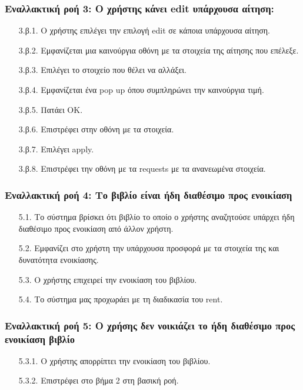 \documentclass[12pt,a4paper]{article}
\begin{document}
\subsubsection*{Εναλλακτική ροή 3: Ο χρήστης κάνει edit υπάρχουσα αίτηση:}
\begin{enumerate}
    \item [3.β.1.] Ο χρήστης επιλέγει την επιλογή edit σε κάποια υπάρχουσα αίτηση.
    \item [3.β.2.] Εμφανίζεται μια καινούργια οθόνη με τα στοιχεία της αίτησης που επέλεξε.
    \item [3.β.3.] Επιλέγει το στοιχείο που θέλει να αλλάξει.
    \item [3.β.4.] Εμφανίζεται ένα pop up όπου συμπληρώνει την καινούργια τιμή.
    \item [3.β.5.] Πατάει OK.
    \item [3.β.6.] Επιστρέφει στην οθόνη με τα στοιχεία.
    \item [3.β.7.] Επιλέγει apply.
    \item [3.β.8.] Επιστρέφει την οθόνη με τα requests με τα ανανεωμένα στοιχεία.
\end{enumerate}

\subsubsection*{Εναλλακτική ροή 4: Το βιβλίο είναι ήδη διαθέσιμο προς ενοικίαση}
\begin{enumerate}
    \item[5.1.] Το σύστημα βρίσκει ότι βιβλίο το οποίο ο χρήστης αναζητούσε υπάρχει ήδη διαθέσιμο προς ενοικίαση από άλλον χρήστη.
    \item[5.2.] Εμφανίζει στο χρήστη την υπάρχουσα προσφορά με τα στοιχεία της και δυνατότητα ενοικίασης.
    \item[5.3.] Ο χρήστης επιχειρεί την ενοικίαση του βιβλίου.
    \item[5.4.] Το σύστημα μας προχωράει με τη διαδικασία του rent.
\end{enumerate}

\subsubsection*{Εναλλακτική ροή 5: Ο χρήσης δεν νοικιάζει το ήδη διαθέσιμο προς ενοικίαση βιβλίο}
\begin{enumerate}
    \item [5.3.1.] Ο χρήστης απορρίπτει την ενοικίαση του βιβλίου.
    \item [5.3.2.] Επιστρέφει στο βήμα 2 στη βασική ροή.
\end{enumerate}
\end{document}
